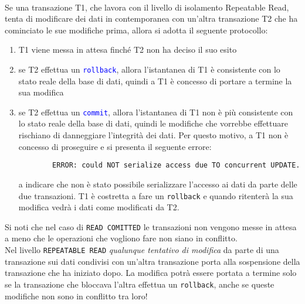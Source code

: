 \documentclass[12pt,a4paper]{book}
\begin{document}
	\paragraph{}Se una transazione T1, che lavora con il livello di isolamento Repeatable Read, tenta di modificare dei dati in contemporanea con un'altra transazione T2 che ha cominciato le sue modifiche prima, allora si adotta il seguente protocollo:
	\begin{enumerate}
		\item T1 viene messa in attesa finché T2 non ha deciso il suo esito
		\item se T2 effettua un \textcolor{blue}{\texttt{rollback}}, allora l'istantanea di T1 è consistente con lo stato reale della base di dati, quindi a T1 è concesso di portare a termine la sua modifica
		\item se T2 effettua un \textcolor{blue}{\texttt{commit}}, allora l'istantanea di T1 non è più consistente con lo stato reale della base di dati, quindi le modifiche che vorrebbe effettuare rischiano di danneggiare l'integrità dei dati. Per questo motivo, a T1 non è concesso di proseguire e si presenta il seguente errore:
		\begin{lstlisting}
		ERROR: could NOT serialize access due TO concurrent UPDATE.
		\end{lstlisting}
		a indicare che non è stato possibile serializzare l'accesso ai dati da parte delle due transazioni. T1 è costretta a fare un \texttt{rollback} e quando ritenterà la sua modifica vedrà i dati come modificati da T2.
	\end{enumerate} 
	Si noti che nel caso di \texttt{READ COMITTED} le transazioni non vengono messe in attesa a meno che le operazioni che vogliono fare non siano in conflitto.\\
	Nel livello \texttt{REPEATABLE READ} \textit{qualunque tentativo di modifica} da parte di una transazione sui dati condivisi con un'altra transazione porta alla sospensione della transazione che ha iniziato dopo. La modifica potrà essere portata a termine solo se la transazione che bloccava l'altra effettua un \texttt{rollback}, anche se queste modifiche non sono in conflitto tra loro!
\end{document}
